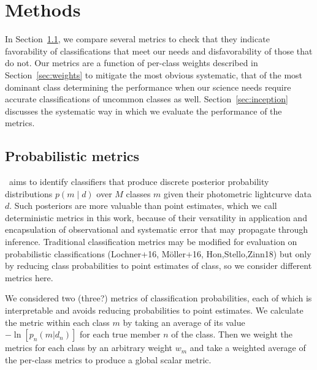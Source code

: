 \section{Methods}
\label{sec:methods}

In Section~\ref{sec:metrics}, we compare several metrics to check that they indicate favorability of classifications that meet our needs and disfavorability of those that do not.
Our metrics are a function of per-class weights described in Section~\ref{sec:weights} to mitigate the most obvious systematic, that of the most dominant class determining the performance when our science needs require accurate classifications of uncommon classes as well.
Section~\ref{sec:inception} discusses the systematic way in which we evaluate the performance of the metrics.

\subsection{Probabilistic metrics}
\label{sec:metrics}

\plasticc\ aims to identify classifiers that produce discrete posterior probability distributions $p(m \mid d)$ over $M$ classes $m$ given their photometric lightcurve data $d$.
Such posteriors are more valuable than point estimates, which we call deterministic metrics in this work, because of their versatility in application and encapsulation of observational and systematic error that may propagate through inference.
Traditional classification metrics may be modified for evaluation on probabilistic classifications (Lochner+16, M\"{o}ller+16, Hon,Stello,Zinn18) but only by reducing class probabilities to point estimates of class, so we consider different metrics here.



We considered two (three?) metrics of classification probabilities, each of which is interpretable and avoids reducing probabilities to point estimates.
We calculate the metric within each class $m$ by taking an average of its value $-\ln[p_{n}(m | d_{n})]$ for each true member $n$ of the class.  Then we weight the metrics for each class by an arbitrary weight $w_{m}$ and take a weighted average of the per-class metrics to produce a global scalar metric.

